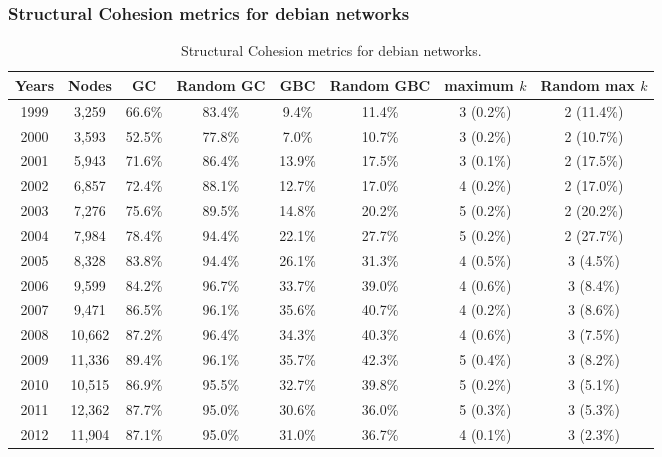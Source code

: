 \documentclass[ignorenonframetext,red,8pt,notes=hide]{beamer}
\begin{document}
\begin{frame}
\frametitle{Structural Cohesion metrics for debian networks}
\begin{table}[H]
\begin{center}
\begin{footnotesize}
\begin{tabular}{|c|c|c|c|c|c|c|c|}
\hline
Years&Nodes&GC&Random GC&GBC&Random GBC&maximum $k$&Random max $k$\\
\hline
1999&3,259&66.6\%&83.4\%&9.4\%&11.4\%&3 (0.2\%)&2 (11.4\%)\\
2000&3,593&52.5\%&77.8\%&7.0\%&10.7\%&3 (0.2\%)&2 (10.7\%)\\
2001&5,943&71.6\%&86.4\%&13.9\%&17.5\%&3 (0.1\%)&2 (17.5\%)\\
2002&6,857&72.4\%&88.1\%&12.7\%&17.0\%&4 (0.2\%)&2 (17.0\%)\\
2003&7,276&75.6\%&89.5\%&14.8\%&20.2\%&5 (0.2\%)&2 (20.2\%)\\
2004&7,984&78.4\%&94.4\%&22.1\%&27.7\%&5 (0.2\%)&2 (27.7\%)\\
2005&8,328&83.8\%&94.4\%&26.1\%&31.3\%&4 (0.5\%)&3 (4.5\%)\\
2006&9,599&84.2\%&96.7\%&33.7\%&39.0\%&4 (0.6\%)&3 (8.4\%)\\
2007&9,471&86.5\%&96.1\%&35.6\%&40.7\%&4 (0.2\%)&3 (8.6\%)\\
2008&10,662&87.2\%&96.4\%&34.3\%&40.3\%&4 (0.6\%)&3 (7.5\%)\\
2009&11,336&89.4\%&96.1\%&35.7\%&42.3\%&5 (0.4\%)&3 (8.2\%)\\
2010&10,515&86.9\%&95.5\%&32.7\%&39.8\%&5 (0.2\%)&3 (5.1\%)\\
2011&12,362&87.7\%&95.0\%&30.6\%&36.0\%&5 (0.3\%)&3 (5.3\%)\\
2012&11,904&87.1\%&95.0\%&31.0\%&36.7\%&4 (0.1\%)&3 (2.3\%)\\
\hline
\end{tabular}
\caption{Structural Cohesion metrics for debian networks.}
\label{str_cohesion_debian}
\end{footnotesize}
\end{center}
\end{table}


\end{frame}
\end{document}
